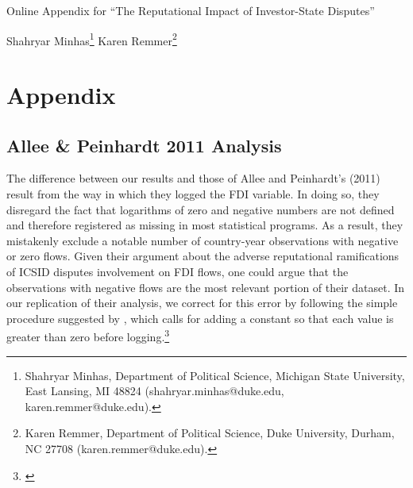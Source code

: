 \documentclass[12pt,onesided]{amsart}
\begin{document}
\thispagestyle{empty}

\begin{center}
{\sc \large Online Appendix for ``The Reputational Impact of Investor-State Disputes''}
\end{center}

\vspace{10mm}

\begin{center}
{\sc Shahryar Minhas}\footnote{Shahryar Minhas, Department of Political Science, Michigan State University, East Lansing, MI 48824 (shahryar.minhas@duke.edu, karen.remmer@duke.edu).}
{\sc Karen Remmer}\footnote{Karen Remmer, Department of Political Science, Duke University, Durham, NC 27708 (karen.remmer@duke.edu).}
\end{center}

\newpage

\setcounter{page}{1}
\doublespacing

\section*{Appendix}
\label{appendix}

\appendix
\setcounter{figure}{0} \renewcommand{\thefigure}{A.\arabic{figure}}
\setcounter{table}{0} \renewcommand{\thetable}{A.\arabic{table}}

\subsection*{Allee \& Peinhardt 2011 Analysis}

The difference between our results and those of Allee and Peinhardt's (2011) result from the way in which they logged the FDI variable. In doing so, they disregard the fact that logarithms of zero and negative numbers are not defined and therefore registered as missing in most statistical programs. As a result, they mistakenly exclude a notable number of country-year observations with negative or zero flows. Given their argument about the adverse reputational ramifications of ICSID disputes involvement on FDI flows, one could argue that the observations with negative flows are the most relevant portion of their dataset. In our replication of their analysis, we correct for this error by following the simple procedure suggested by \citeauthor{li:2009}, which calls for adding a constant so that each value is greater than zero before logging.\footnote{\citet{li:2009}} 
\end{document}
